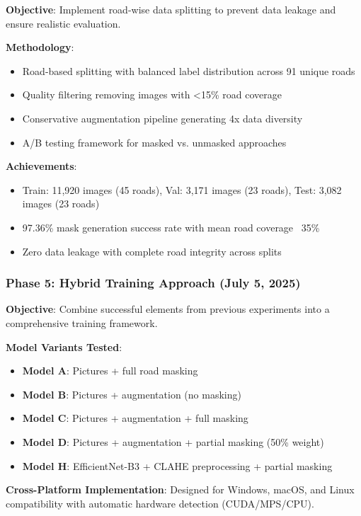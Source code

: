 \documentclass[12pt,twocolumn]{article}
\begin{document}
\textbf{Objective}: Implement road-wise data splitting to prevent data leakage and ensure realistic evaluation.

\textbf{Methodology}:
\begin{itemize}[itemsep=1pt,parsep=0pt,topsep=2pt]
\item Road-based splitting with balanced label distribution across 91 unique roads
\item Quality filtering removing images with <15\% road coverage
\item Conservative augmentation pipeline generating 4x data diversity
\item A/B testing framework for masked vs. unmasked approaches
\end{itemize}

\textbf{Achievements}:
\begin{itemize}[itemsep=1pt,parsep=0pt,topsep=2pt]
\item Train: 11,920 images (45 roads), Val: 3,171 images (23 roads), Test: 3,082 images (23 roads)
\item 97.36\% mask generation success rate with mean road coverage ~35\%
\item Zero data leakage with complete road integrity across splits
\end{itemize}

\subsubsection{Phase 5: Hybrid Training Approach (July 5, 2025)}

\textbf{Objective}: Combine successful elements from previous experiments into a comprehensive training framework.

\textbf{Model Variants Tested}:
\begin{itemize}[itemsep=1pt,parsep=0pt,topsep=2pt]
\item \textbf{Model A}: Pictures + full road masking
\item \textbf{Model B}: Pictures + augmentation (no masking)
\item \textbf{Model C}: Pictures + augmentation + full masking
\item \textbf{Model D}: Pictures + augmentation + partial masking (50\% weight)
\item \textbf{Model H}: EfficientNet-B3 + CLAHE preprocessing + partial masking
\end{itemize}

\textbf{Cross-Platform Implementation}: Designed for Windows, macOS, and Linux compatibility with automatic hardware detection (CUDA/MPS/CPU).
\end{document}
